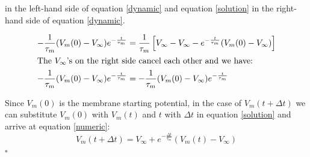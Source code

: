 \documentclass{scrartcl}
\begin{document}
in the left-hand side of equation \ref{dynamic} and equation \ref{solution} in the right-hand side of equation \ref{dynamic}.

\begin{align*}
-\frac{1}{\tau_m}(V_m(0) - V_\infty) e^{-\frac{t}{\tau_m}} &= \frac{1}{\tau_m}\left[ V_\infty - V_\infty - e^{-\frac{t}{\tau_m}}(V_m(0) - V_\infty)\right]\\
\shortintertext{The $V_\infty$'s on the right side cancel each other and we have:}
-\frac{1}{\tau_m}(V_m(0) - V_\infty) e^{-\frac{t}{\tau_m}} &= -\frac{1}{\tau_m}(V_m(0) - V_\infty) e^{-\frac{t}{\tau_m}}
\end{align*}

Since $V_m(0)$ is the membrane starting potential, in the case of $V_m(t+\Delta t)$ we can substitute $V_m(0)$ with $V_m(t)$ and $t$ with $\Delta t$ in equation \ref{solution} and arrive at equation \ref{numeric}:
\begin{equation*}
V_m(t+\Delta t) = V_\infty + e^{-\frac{\Delta t}{\tau_m}}\left( V_m(t) -V_\infty\right)
\end{equation*}
\hfill $\square$
\end{document}

